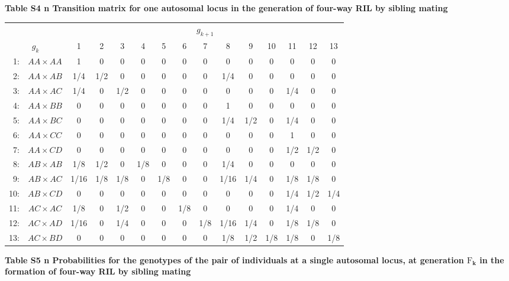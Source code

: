 \documentclass[9pt,letterpaper,twoside]{article}
\begin{document}
\newpage


\noindent \textbf{Table S4 {\color{white} n} Transition matrix for one autosomal locus
in the generation of four-way RIL by sibling mating}

\bigskip

{
\begin{center}
\begin{tabular}{rc@{\hspace{10mm}}ccccccccccccc} \hline
 && \multicolumn{13}{c}{$g_{k+1}$} \\ \cline{3-15}
\multicolumn{2}{c}{$g_k$}  & 1 & 2 & 3 & 4 & 5 & 6 & 7 & 8 & 9 & 10 & 11 & 12 & 13\\ \hline
1: & $AA \times AA$ & 1 & 0 & 0 & 0 & 0 & 0 & 0 & 0 & 0 & 0 & 0 & 0 & 0 \\ 
2: & $AA \times AB$ & 1/4 & 1/2 & 0 & 0 & 0 & 0 & 0 & 1/4 & 0 & 0 & 0 & 0 & 0 \\ 
3: & $AA \times AC$ & 1/4 & 0 & 1/2 & 0 & 0 & 0 & 0 & 0 & 0 & 0 & 1/4 & 0 & 0 \\ 
4: & $AA \times BB$ & 0 & 0 & 0 & 0 & 0 & 0 & 0 & 1 & 0 & 0 & 0 & 0 & 0 \\ 
5: & $AA \times BC$ & 0 & 0 & 0 & 0 & 0 & 0 & 0 & 1/4 & 1/2 & 0 & 1/4 & 0 & 0 \\ 
6: & $AA \times CC$ & 0 & 0 & 0 & 0 & 0 & 0 & 0 & 0 & 0 & 0 & 1 & 0 & 0 \\ 
7: & $AA \times CD$ & 0 & 0 & 0 & 0 & 0 & 0 & 0 & 0 & 0 & 0 & 1/2 & 1/2 & 0 \\ 
8: & $AB \times AB$ & 1/8 & 1/2 & 0 & 1/8 & 0 & 0 & 0 & 1/4 & 0 & 0 & 0 & 0 & 0 \\ 
9: & $AB \times AC$ & 1/16 & 1/8 & 1/8 & 0 & 1/8 & 0 & 0 & 1/16 & 1/4 & 0 & 1/8 & 1/8 & 0 \\ 
10: & $AB \times CD$ & 0 & 0 & 0 & 0 & 0 & 0 & 0 & 0 & 0 & 0 & 1/4 & 1/2 & 1/4 \\ 
11: & $AC \times AC$ & 1/8 & 0 & 1/2 & 0 & 0 & 1/8 & 0 & 0 & 0 & 0 & 1/4 & 0 & 0 \\ 
12: & $AC \times AD$ & 1/16 & 0 & 1/4 & 0 & 0 & 0 & 1/8 & 1/16 & 1/4 & 0 & 1/8 & 1/8 & 0 \\ 
13: & $AC \times BD$ & 0 & 0 & 0 & 0 & 0 & 0 & 0 & 1/8 & 1/2 & 1/8 & 1/8 & 0 & 1/8 \\ 
\hline
\end{tabular}
\end{center}

}

\newpage


\noindent \textbf{Table S5 {\color{white} n} Probabilities for the genotypes of the 
pair of individuals at a single autosomal locus, at generation $\text{F}_{\boldsymbol{k}}$
in the formation of four-way RIL by sibling mating}
\end{document}
